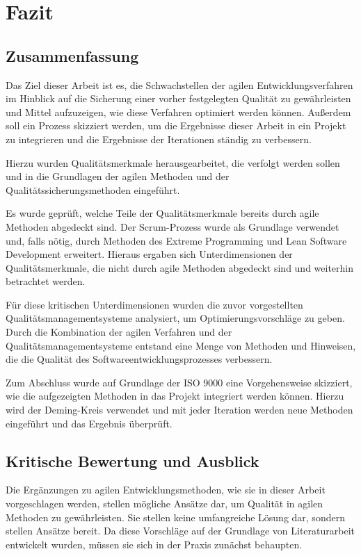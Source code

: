 \chapter{Fazit}

    \section{Zusammenfassung}
    
        Das Ziel dieser Arbeit ist es, die Schwachstellen der agilen Entwicklungsverfahren im Hinblick auf die Sicherung einer vorher festgelegten Qualität zu gewährleisten und Mittel aufzuzeigen, wie diese Verfahren optimiert werden können. Außerdem soll ein Prozess skizziert werden, um die Ergebnisse dieser Arbeit in ein Projekt zu integrieren und die Ergebnisse der Iterationen ständig zu verbessern.
        
        Hierzu wurden Qualitätsmerkmale herausgearbeitet, die verfolgt werden sollen und in die Grundlagen der agilen Methoden und der Qualitätssicherungsmethoden eingeführt.
        
        Es wurde geprüft, welche Teile der Qualitätsmerkmale bereits durch agile Methoden abgedeckt sind. Der Scrum-Prozess wurde als Grundlage verwendet und, falls nötig, durch Methoden des Extreme Programming und Lean Software Development erweitert. Hieraus ergaben sich Unterdimensionen der Qualitätsmerkmale, die nicht durch agile Methoden abgedeckt sind und weiterhin betrachtet werden.
        
        Für diese kritischen Unterdimensionen wurden die zuvor vorgestellten Qualitätsmanagementsysteme analysiert, um Optimierungsvorschläge zu geben. Durch die Kombination der agilen Verfahren und der Qualitätsmanagementsysteme entstand eine Menge von Methoden und Hinweisen, die die Qualität des Softwareentwicklungsprozesses verbessern.
        
        Zum Abschluss wurde auf Grundlage der ISO 9000 eine Vorgehensweise skizziert, wie die aufgezeigten Methoden in das Projekt integriert werden können. Hierzu wird der Deming-Kreis verwendet und mit jeder Iteration werden neue Methoden eingeführt und das Ergebnis überprüft.
    
    \section{Kritische Bewertung und Ausblick}
    
        Die Ergänzungen zu agilen Entwicklungsmethoden, wie sie in dieser Arbeit vorgeschlagen werden, stellen mögliche Ansätze dar, um Qualität in agilen Methoden zu gewährleisten. Sie stellen keine umfangreiche Lösung dar, sondern stellen Ansätze bereit. Da diese Vorschläge auf der Grundlage von Literaturarbeit entwickelt wurden, müssen sie sich in der Praxis zunächst behaupten.
        
